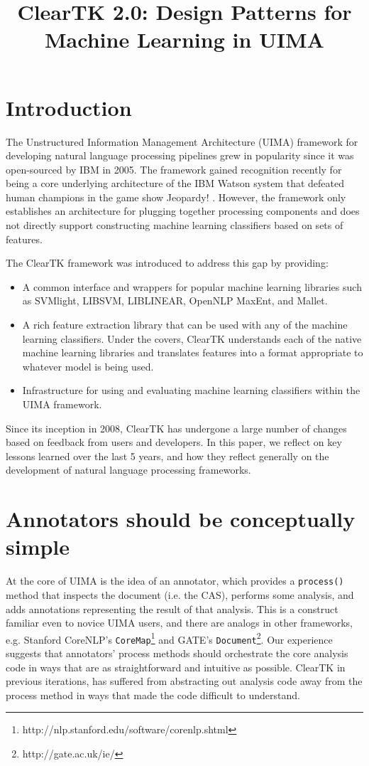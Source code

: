 \documentclass[10pt, a4paper]{article}
\title{ClearTK 2.0: Design Patterns for Machine Learning in UIMA}
\newcommand{\code}[1]{\texttt{\small #1}}
\begin{document}
\maketitleabstract

\section{Introduction}
The Unstructured Information Management Architecture (UIMA) framework for developing natural language processing pipelines grew in popularity since it was open-sourced by IBM in 2005.
The framework gained recognition recently for being a core underlying architecture of the IBM Watson system that defeated human champions in the game show Jeopardy! \cite{ferrucci_building_2010}.
However, the framework only establishes an architecture for plugging together processing components and does not directly support constructing machine learning classifiers based on sets of features.

The ClearTK framework was introduced to address this gap \cite{ogren-etal:2008:UIMA-LREC,ogren-etal:2009:UIMA-GSCL} by providing:
\begin{itemize}
\item A common interface and wrappers for popular machine learning libraries such as SVMlight, LIBSVM, LIBLINEAR, OpenNLP MaxEnt, and Mallet.
\item A rich feature extraction library that can be used with any of the machine learning classifiers. Under the covers, ClearTK understands each of the native machine learning libraries and translates features into a format appropriate to whatever model is being used.
\item Infrastructure for using and evaluating machine learning classifiers within the UIMA framework.
\end{itemize}

Since its inception in 2008, ClearTK has undergone a large number of changes based on feedback from users and developers.
In this paper, we reflect on key lessons learned over the last 5 years, and how they reflect generally on the development of natural language processing frameworks.

\section{Annotators should be conceptually simple}
\label{sec:annotators}
At the core of UIMA is the idea of an annotator, which provides a \code{process()} method that inspects the document (i.e. the CAS), performs some analysis, and adds annotations representing the result of that analysis.  This is a construct familiar even to novice UIMA users, and there are analogs in other frameworks, e.g. Stanford CoreNLP's \code{CoreMap}\footnote{http://nlp.stanford.edu/software/corenlp.shtml} and GATE's \code{Document}\footnote{http://gate.ac.uk/ie/}.  Our experience suggests that annotators' process methods should orchestrate the core analysis code in ways that are as straightforward and intuitive as possible.  ClearTK in previous iterations, has suffered from abstracting out analysis code away from the process method in ways that made the code difficult to understand.  
\end{document}

